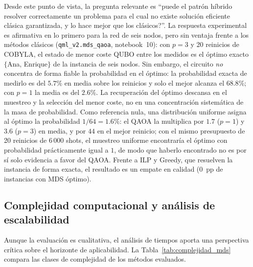 Desde este punto de vista, la pregunta relevante es ``\textquestiondown{}puede el patrón híbrido resolver correctamente un problema para el cual no existe solución eficiente clásica garantizada, y lo hace mejor que los clásicos?''. La respuesta experimental es afirmativa en lo primero para la red de seis nodos, pero sin ventaja frente a los métodos clásicos (\texttt{qml\_v2.mds\_qaoa}, notebook~10): con $p=3$ y 20 reinicios de COBYLA, el estado de menor coste QUBO entre los medidos es el óptimo exacto $\{$Ana, Enrique$\}$ de la instancia de seis nodos. Sin embargo, el circuito \emph{no} concentra de forma fiable la probabilidad en el óptimo: la probabilidad exacta de medirlo es del $5.7\%$ en media sobre los reinicios y solo el mejor alcanza el $68.8\%$; con $p=1$ la media es del $2.6\%$. La recuperación del óptimo descansa en el muestreo y la selección del menor coste, no en una concentración sistemática de la masa de probabilidad. Como referencia nula, una distribución uniforme asigna al óptimo la probabilidad $1/64=1.6\%$: el QAOA la multiplica por $1.7$ ($p=1$) y $3.6$ ($p=3$) en media, y por $44$ en el mejor reinicio; con el mismo presupuesto de 20 reinicios de 6\,000 shots, el muestreo uniforme encontraría el óptimo con probabilidad prácticamente igual a $1$, de modo que haberlo encontrado no es por sí solo evidencia a favor del QAOA. Frente a ILP y Greedy, que resuelven la instancia de forma exacta, el resultado es un empate en calidad ($0$~pp de instancias con MDS óptimo).

\subsection{Complejidad computacional y análisis de escalabilidad}

Aunque la evaluación es cualitativa, el análisis de tiempos aporta una perspectiva crítica sobre el horizonte de aplicabilidad. La Tabla~\ref{tab:complejidad_mds} compara las clases de complejidad de los métodos evaluados.

